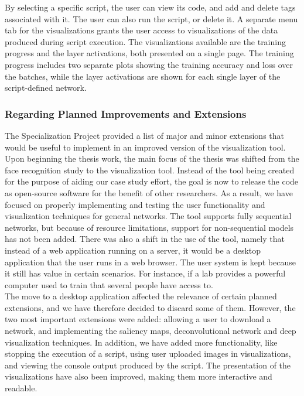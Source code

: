 \noindent By selecting a specific script, the user can view its code, and add and delete tags associated with it. The user can also run the script, or delete it. A separate menu tab for the visualizations grants the user access to visualizations of the data produced during script execution. The visualizations available are the training progress and the layer activations, both presented on a single page. The training progress includes two separate plots showing the training accuracy and loss over the batches, while the layer activations are shown for each single layer of the script-defined network.

\subsubsection{Regarding Planned Improvements and Extensions}

The Specialization Project provided a list of major and minor extensions that would be useful to implement in an improved version of the visualization tool. Upon beginning the thesis work, the main focus of the thesis was shifted from the face recognition study to the visualization tool. Instead of the tool being created for the purpose of aiding our case study effort, the goal is now to release the code as open-source software for the benefit of other researchers. As a result, we have focused on properly implementing and testing the user functionality and visualization techniques for general networks. The tool supports fully sequential networks, but because of resource limitations, support for non-sequential models has not been added. There was also a shift in the use of the tool, namely that instead of a web application running on a server, it would be a desktop application that the user runs in a web browser. The user system is kept because it still has value in certain scenarios. For instance, if a lab provides a powerful computer used to train  that several people have access to. \\

\noindent The move to a desktop application affected the relevance of certain planned extensions, and we have therefore decided to discard some of them. However, the two most important extensions were added: allowing a user to download a network, and implementing the saliency maps, deconvolutional network and deep visualization techniques. In addition, we have added more functionality, like stopping the execution of a script, using user uploaded images in visualizations, and viewing the console output produced by the script. The presentation of the visualizations have also been improved, making them more interactive and readable.

